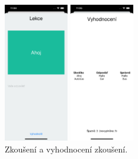 \documentclass[10pt, a4paper]{article}
\begin{document}
\begin{figure}
\begin{center}
\begin{multicols}{2}

\includegraphics[width=0.25\textwidth]{img/zkouseni.png} \par
\includegraphics[width=0.25\textwidth]{img/vyhodnoceni.png} \par

\end{multicols}
\caption{Zkoušení a vyhodnocení zkoušení.} \label{zkouseni_vyhodnoceni} 
\end{center}
\end{figure}
\end{document}
